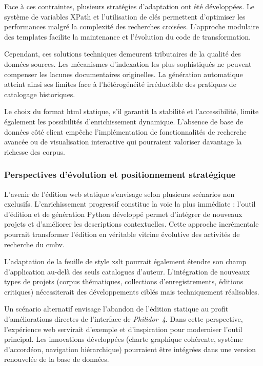 Face à ces contraintes, plusieurs stratégies d'adaptation ont été développées. Le système de variables XPath et l'utilisation de clés permettent d'optimiser les performances malgré la complexité des recherches croisées. L'approche modulaire des templates facilite la maintenance et l'évolution du code de transformation.

Cependant, ces solutions techniques demeurent tributaires de la qualité des données sources. Les mécanismes d'indexation les plus sophistiqués ne peuvent compenser les lacunes documentaires originelles. La génération automatique atteint ainsi ses limites face à l'hétérogénéité irréductible des pratiques de catalogage historiques.

Le choix du format \gls{html} statique, s'il garantit la stabilité et l'accessibilité, limite également les possibilités d'enrichissement dynamique. L'absence de base de données côté client empêche l'implémentation de fonctionnalités de recherche avancée ou de visualisation interactive qui pourraient valoriser davantage la richesse des corpus.

\subsubsection{Perspectives d'évolution et positionnement stratégique}

L'avenir de l'édition web statique s'envisage selon plusieurs scénarios non exclusifs. L'enrichissement progressif constitue la voie la plus immédiate : l'outil d'édition et de génération Python développé permet d'intégrer de nouveaux projets et d'améliorer les descriptions contextuelles. Cette approche incrémentale pourrait transformer l'édition en véritable vitrine évolutive des activités de recherche du \gls{cmbv}.

L'adaptation de la feuille de style \gls{xslt} pourrait également étendre son champ d'application au-delà des seuls catalogues d'auteur. L'intégration de nouveaux types de projets (corpus thématiques, collections d'enregistrements, éditions critiques) nécessiterait des développements ciblés mais techniquement réalisables.

Un scénario alternatif envisage l'abandon de l'édition statique au profit d'améliorations directes de l'interface de \textit{Philidor~4}. Dans cette perspective, l'expérience web servirait d'exemple et d'inspiration pour moderniser l'outil principal. Les innovations développées (charte graphique cohérente, système d'accordéon, navigation hiérarchique) pourraient être intégrées dans une version renouvelée de la base de données.

